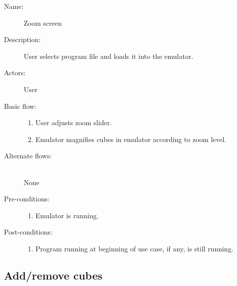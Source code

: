 \documentclass[12pt]{article}
\begin{document}
    \begin{description}
      \item[Name:] Zoom screen
      \item[Description:] User selects program file and loads it into the emulator.
      \item[Actors:] User
      \item[Basic flow:] \hfill
        \begin{enumerate}
	  \item{User adjusts zoom slider.}
	  \item{Emulator magnifies cubes in emulator according to zoom level.}
        \end{enumerate}
      \item[Alternate flows:] \hfill \\
	None
      \item[Pre-conditions:] \hfill
        \begin{enumerate}
          \item{Emulator is running.}
        \end{enumerate}
      \item[Post-conditions:] \hfill
        \begin{enumerate}
	  \item{Program running at beginning of use case, if any, is still running.}
        \end{enumerate}
    \end{description}	

  \subsection{Add/remove cubes}
\end{document}
